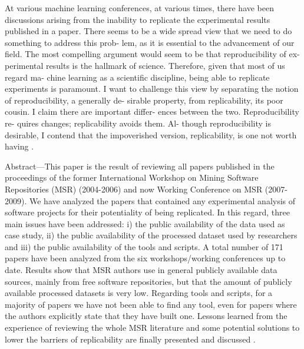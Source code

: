 At various machine learning conferences, at
various times, there have been discussions
arising from the inability to replicate the
experimental results published in a paper.
There seems to be a wide spread view that we
need to do something to address this prob-
lem, as it is essential to the advancement
of our field. The most compelling argument
would seem to be that reproducibility of ex-
perimental results is the hallmark of science.
Therefore, given that most of us regard ma-
chine learning as a scientific discipline, being
able to replicate experiments is paramount.
I want to challenge this view by separating
the notion of reproducibility, a generally de-
sirable property, from replicability, its poor
cousin. I claim there are important differ-
ences between the two. Reproducibility re-
quires changes; replicability avoids them. Al-
though reproducibility is desirable, I contend
that the impoverished version, replicability,
is one not worth having \cite{drummond2009replicability}.

Abstract—This paper is the result of reviewing all papers
published in the proceedings of the former International
Workshop on Mining Software Repositories (MSR) (2004-2006)
and now Working Conference on MSR (2007-2009). We have
analyzed the papers that contained any experimental analysis
of software projects for their potentiality of being replicated.
In this regard, three main issues have been addressed: i) the
public availability of the data used as case study, ii) the public
availability of the processed dataset used by researchers and iii)
the public availability of the tools and scripts. A total number of
171 papers have been analyzed from the six workshops/working
conferences up to date. Results show that MSR authors use
in general publicly available data sources, mainly from free
software repositories, but that the amount of publicly available
processed datasets is very low. Regarding tools and scripts, for
a majority of papers we have not been able to find any tool,
even for papers where the authors explicitly state that they have
built one. Lessons learned from the experience of reviewing the
whole MSR literature and some potential solutions to lower the
barriers of replicability are finally presented and discussed
\cite{robles2010replicating}.

%
%

